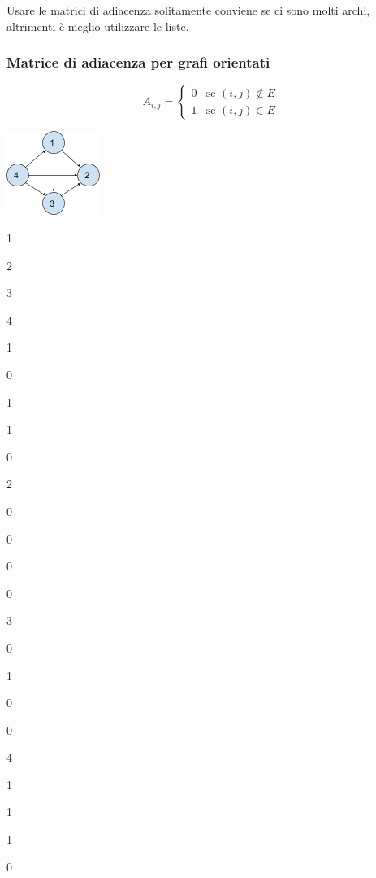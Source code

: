 \documentclass{article}
\begin{document}
{}

{Usare le matrici di adiacenza solitamente conviene se ci sono molti
archi, altrimenti è meglio utilizzare le liste.}

\hypertarget{h.30h8k4akc7l}{\subsubsection{\texorpdfstring{{Matrice di adiacenza per grafi orientati}}{Matrice di adiacenza per grafi orientati}}\label{h.30h8k4akc7l}}


\begin{equation}
A_{i,j} = 
\begin{cases}
0 & \mbox{se } (i,j) \notin E \\ 
1 & \mbox{se } (i,j) \in E
\end{cases}
\end{equation}

\protect\hypertarget{t.baa371c993d5b7baad0f4dd74d8432f916b9230a}{}{}\protect\hypertarget{t.37}{}{}

{\includegraphics{images/image529.png}}

{}

{1}

{2}

{3}

{4}

{1}

{0}

{1}

{1}

{0}

{2}

{0}

{0}

{0}

{0}

{3}

{0}

{1}

{0}

{0}

{4}

{1}

{1}

{1}

{0}
\end{document}
